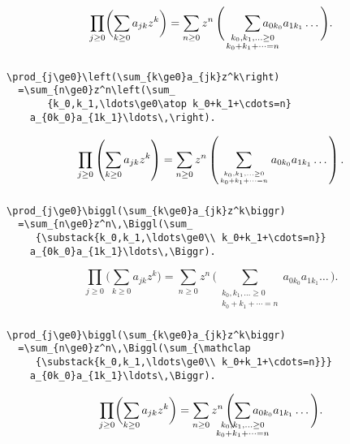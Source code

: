 \documentclass{beamer}
\begin{document}
\begin{frame}
\frametitle{\texttt{\string\smashoperator}}
\large
\[
\prod_{j\ge0}\biggl(\sum_{k\ge0}a_{jk}z^k\biggr)
  =\sum_{n\ge0}z^n\,\Biggl(\smashoperator[r]{\sum_
       {\scriptstyle k_0,k_1,\ldots\ge0\atop
             \scriptstyle k_0+k_1+\cdots=n}}
    a_{0k_0}a_{1k_1}\ldots\,\Biggr).
\]    
\end{frame}

\begin{frame}[fragile,t]
\frametitle{\texttt{\string\smashoperator}}
\begin{verbatim}
\prod_{j\ge0}\left(\sum_{k\ge0}a_{jk}z^k\right)
  =\sum_{n\ge0}z^n\left(\sum_
       {k_0,k_1,\ldots\ge0\atop k_0+k_1+\cdots=n}
    a_{0k_0}a_{1k_1}\ldots\,\right).
\end{verbatim}
\medskip
\[
\prod_{j\ge0}\left(\sum_{k\ge0}a_{jk}z^k\right)
  =\sum_{n\ge0}z^n\left(\sum_
       {k_0,k_1,\ldots\ge0\atop k_0+k_1+\cdots=n}
    a_{0k_0}a_{1k_1}\ldots\,\right).
\]    
\end{frame}

\begin{frame}[fragile,t]
\frametitle{\texttt{\string\smashoperator}}
\begin{verbatim}
\prod_{j\ge0}\biggl(\sum_{k\ge0}a_{jk}z^k\biggr)
  =\sum_{n\ge0}z^n\,\Biggl(\sum_
     {\substack{k_0,k_1,\ldots\ge0\\ k_0+k_1+\cdots=n}}
    a_{0k_0}a_{1k_1}\ldots\,\Biggr).
\end{verbatim}
\medskip
\[
\prod_{j\ge0}\biggl(\sum_{k\ge0}a_{jk}z^k\biggr)
  =\sum_{n\ge0}z^n\,\Biggl(\sum_
       {\substack{k_0,k_1,\ldots\ge0\\ k_0+k_1+\cdots=n}}
    a_{0k_0}a_{1k_1}\ldots\,\Biggr).
\]    
\end{frame}

\begin{frame}[fragile,t]
\frametitle{\texttt{\string\smashoperator}}
\begin{verbatim}
\prod_{j\ge0}\biggl(\sum_{k\ge0}a_{jk}z^k\biggr)
  =\sum_{n\ge0}z^n\,\Biggl(\sum_{\mathclap
     {\substack{k_0,k_1,\ldots\ge0\\ k_0+k_1+\cdots=n}}}
    a_{0k_0}a_{1k_1}\ldots\,\Biggr).
\end{verbatim}
\medskip
\[
\prod_{j\ge0}\biggl(\sum_{k\ge0}a_{jk}z^k\biggr)
  =\sum_{n\ge0}z^n\,\Biggl(\sum_{\mathclap
       {\substack{k_0,k_1,\ldots\ge0\\ k_0+k_1+\cdots=n}}}
    a_{0k_0}a_{1k_1}\ldots\,\Biggr).
\]  
\end{frame}
\end{document}
